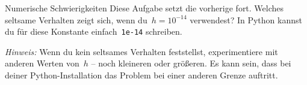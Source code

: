 \documentclass{blatt}
\begin{document}
\begin{aufgabe}{Numerische Schwierigkeiten}
Diese Aufgabe setzt die vorherige fort. Welches seltsame Verhalten zeigt sich,
wenn du~$h = 10^{-14}$ verwendest? In Python kannst du für diese Konstante
einfach~\texttt{1e-14} schreiben.

\emph{Hinweis:} Wenn du kein seltsames Verhalten feststellst, experimentiere
mit anderen Werten von~$h$ -- noch kleineren oder größeren. Es kann sein, dass
bei deiner Python-Installation das Problem bei einer anderen Grenze auftritt.
\end{aufgabe}
\end{document}
